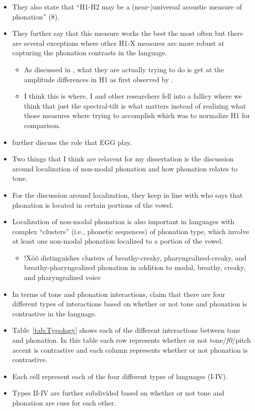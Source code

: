 \begin{itemize}
    \item They also state that ``H1-H2 may be a (near-)universal acoustic measure of phonation'' (8).
    \item They further say that this measure works the best the most often but there are several exceptions where other H1-X measures are more robust at capturing the phonation contrasts in the language. 
    \begin{itemize}
        \item As discussed in \citet{chaiH1H2AcousticMeasure2022}, what they are actually trying to do is get at the amplitude differences in H1 as first observed by \citet{fischer-jorgensenPhoneticAnalysisBreathy1968,laverVoiceQualityIndexical1968}.
        \item I think this is where, I and other researchers fell into a fallicy where we think that just the spectral-tilt is what matters instead of realizing what those measures where trying to accomplish which was to normalize H1 for comparison. 
    \end{itemize}
    \item \citet{espositoCrosslinguisticPatternsPhonation2020} further discuss the role that EGG play. 
    \item Two things that I think are relavent for my dissertation is the discussion around localization of non-modal phonation and how phonation relates to tone. 
    \item For the discussion around localization, they keep in line with \citet{silvermanLaryngealComplexityOtomanguean1997} who says that phonation is located in certain portions of the vowel. 
    \item Localization of non-modal phonation is also important in languages with complex ``clusters'' (i.e., phonetic sequences) of phonation type, which involve at least one non-modal phonation localized to a portion of the vowel. 
    \begin{itemize}
        \item !Xóõ distinguishes clusters of breathy-creaky, pharyngealized-creaky, and breathy-pharyngealized phonation in addition to modal, breathy, creaky, and pharyngealized voice
    \end{itemize}
    \item In terms of tone and phonation interactions, \citet{espositoCrosslinguisticPatternsPhonation2020} claim that there are four different types of interactions based on whether or not tone and phonation is contrastive in the language. 
    \item Table~\ref{tab:Typology} shows each of the different interactions between tone and phonation. In this table each row represents whether or not tone/\textit{f0}/pitch accent is contrastive and each column represents whether or not phonation is contrastive. 
    \item Each cell represent each of the four different types of languages (I-IV). 
    \item Types II-IV are further subdivided based on whether or not tone and phonation are cues for each other. 
\end{itemize}

